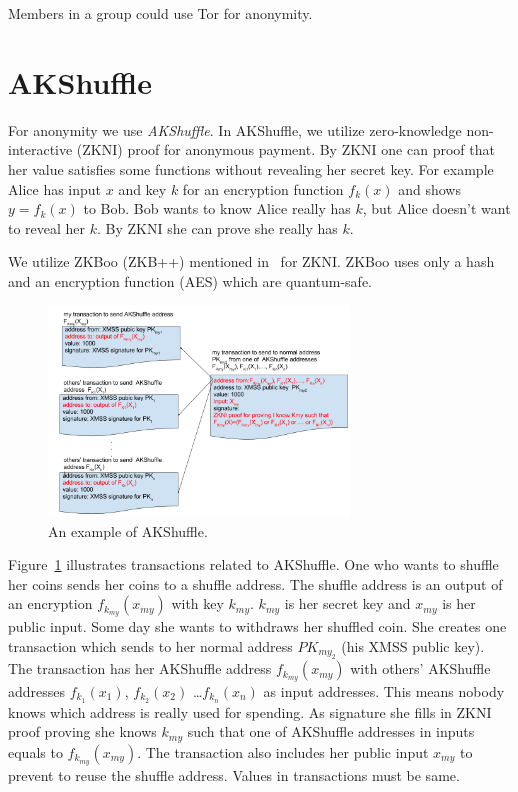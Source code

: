 \documentclass[a4paper,10pt,twocolumn]{article}
\begin{document}
Members in a group could use Tor for anonymity.


\section{AKShuffle}
\label{sec:aks}

For anonymity we use \emph{AKShuffle}. In AKShuffle, we utilize zero-knowledge non-interactive (ZKNI) proof for
anonymous payment. By ZKNI one can proof that her value satisfies some functions without revealing her secret key.
For example Alice has input \(x\)  and key \( k \)  for an encryption function \( f_{k}(x) \) and shows \( y=f_k(x) \) to Bob.
Bob wants to know Alice really has \(k\), but Alice doesn't want to reveal her \(k\).
By ZKNI  she can prove she really has \( k\).

We utilize ZKBoo (ZKB++) mentioned in~\cite{zkb} for ZKNI. ZKBoo uses only a hash and an encryption function (AES) which are quantum-safe.


\begin{figure}[ht]
	\begin{center}
	\includegraphics[width=80mm]{shuffle.png}
	  \caption{An example of AKShuffle.}
    \label{fig:shuffle}
	\end{center}
 \end{figure}

 Figure~\ref{fig:shuffle} illustrates transactions related to AKShuffle. One who wants to shuffle her coins sends her coins to a shuffle address.
 The shuffle address is an output of an encryption \( f_{k_{my}}(x_{my}) \) with key \( k_{my} \). 
 \(k_{my}\) is her secret key  and \(x_{my}\) is her public input.
 Some day she wants to  withdraws her shuffled coin. She creates one transaction which sends to her normal address \(PK_{my_2}\) (his XMSS public key).
 The transaction has her AKShuffle address \( f_{k_{my}}(x_{my}) \) with others' AKShuffle addresses 
\( f_{k_{1}}(x_{1}) \), \( f_{k_{2}}(x_{2}) \) \dots \( f_{k_{n}}(x_{n}) \) as input addresses. 
This means nobody knows which address is really used for spending. As signature she fills in ZKNI proof proving she knows \( k_{my} \) such that 
one of AKShuffle addresses in inputs equals  to \( f_{k_{my}}(x_{my}) \). The transaction also includes her public input \( x_{my} \)
to prevent to reuse the shuffle address. Values in transactions must be same.
\end{document}
